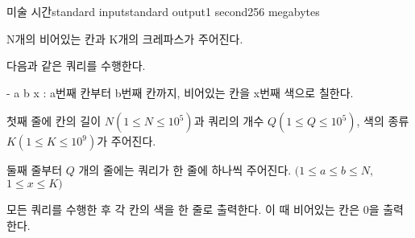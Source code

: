\begin{problem}{미술 시간}{standard input}{standard output}{1 second}{256 megabytes}

N개의 비어있는 칸과 K개의 크레파스가 주어진다. 

다음과 같은 쿼리를 수행한다. 

- a b x : a번째 칸부터 b번째 칸까지, 비어있는 칸을 x번째 색으로 칠한다.

\InputFile
첫째 줄에 칸의 길이 $N(1≤N≤10^5)$과 쿼리의 개수 $Q(1≤Q≤10^5)$, 색의 종류 $K(1≤K≤10^9)$가 주어진다. 

둘째 줄부터 $Q$ 개의 줄에는 쿼리가 한 줄에 하나씩 주어진다. $(1≤a≤b≤N,$ $1≤x≤K)$

\OutputFile
모든 쿼리를 수행한 후 각 칸의 색을 한 줄로 출력한다. 이 때 비어있는 칸은 0을 출력한다. 

\Example

\begin{example}
%
\end{example}

\end{problem}

